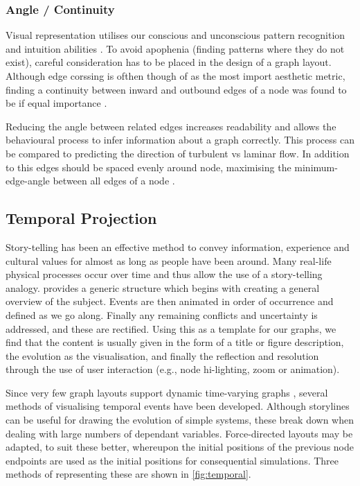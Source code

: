 \subsubsection{ Angle / Continuity}
Visual representation utilises our conscious and unconscious pattern recognition and intuition abilities \citep{pattern}. To avoid apophenia (finding patterns where they do not exist), careful  consideration has to be placed in the design of a graph layout. 
Although edge corssing is ofthen though of as the most import aesthetic metric, finding a continuity between inward and outbound edges of a node was found to be if equal importance \citep{continuity}.

Reducing the angle between related edges increases readability and allows the behavioural process to infer information about a graph correctly. This process can be compared to predicting the direction of turbulent vs laminar flow. In addition to this edges should be spaced evenly around node, maximising the minimum-edge-angle between all edges of a node \citep{aestheticsgraphvis}. 



\subsection{Temporal Projection}
Story-telling has been an effective method to convey information, experience and cultural values for almost as long as people have been around. Many real-life physical processes occur over time and thus allow the use of a story-telling analogy. \cite{storytelling} provides a generic structure which begins with creating a general overview of the subject. Events are then animated in order of occurrence and defined as we go along. Finally any remaining conflicts and uncertainty is addressed, and these are rectified.  
Using this as a template for our graphs, we find that the content is usually given in the form of a title or figure description, the evolution as the visualisation, and finally the reflection and resolution through the use of user interaction (e.g., node hi-lighting, zoom or animation).

Since very few graph layouts support dynamic time-varying graphs \citep{tvg}, several methods of visualising temporal events have been developed. 
Although storylines can be useful for drawing the evolution of simple systems, these break down when dealing with large numbers of dependant variables. Force-directed layouts may be adapted, to suit these better, whereupon the initial positions of the previous node endpoints are used as the initial positions for consequential simulations. Three methods of representing these are shown in \autoref{fig:temporal}.


